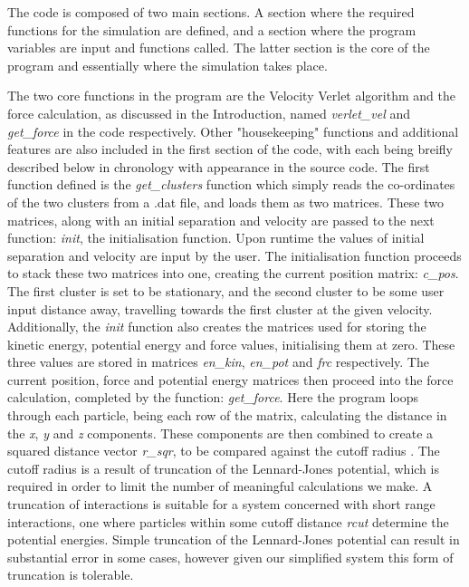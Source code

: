 \documentclass{article}
\begin{document}
\begin{multicols}{2}
The code is composed of two main sections. A section where the required functions for the simulation are defined, and a section where the program variables are input and functions called. The latter section is the core of the program and essentially where the simulation takes place.

The two core functions in the program are the Velocity Verlet algorithm and the force calculation, as discussed in the Introduction, named 
\textit{verlet\_vel} and \textit{get\_force} in the code respectively. Other "housekeeping" functions and additional features are also included in the first section of the code, with each being breifly described below in chronology with appearance in the source code. \newline The first function defined is the \textit{get\_clusters} function which simply reads the co-ordinates of the two clusters from a .dat file, and loads them as two matrices. These two matrices, along with an initial separation and velocity are passed to the next function: \textit{init}, the initialisation function. Upon runtime the values of initial separation and velocity are input by the user. The initialisation function proceeds to stack these two matrices into one, creating the current position matrix: \textit{c\_pos}. The first cluster is set to be stationary, and the second cluster to be some user input distance away, travelling towards the first cluster at the given velocity. Additionally, the \textit{init} function also creates the matrices used for storing the kinetic energy, potential energy and force values, initialising them at zero. These three values are stored in matrices \textit{en\_kin}, \textit{en\_pot} and \textit{frc} respectively. \newline The current position, force and potential energy matrices then proceed into the force calculation, completed by the function: \textit{get\_force}. Here the program loops through each particle, being each row of the matrix, calculating the distance in the \textit{x}, \textit{y} and \textit{z} components. These components are then combined to create a squared distance vector \textit{r\_sqr}, to be compared against the cutoff radius \cite{frenkel}. The cutoff radius is a result of truncation of the Lennard-Jones potential, which is required in order to limit the number of meaningful calculations we make. A truncation of interactions is suitable for a system concerned with short range interactions, one where particles within some cutoff distance \textit{rcut} determine the potential energies. Simple truncation of the Lennard-Jones potential can result in substantial error in some cases, however given our simplified system this form of truncation is tolerable.

\end{multicols}
\end{document}
